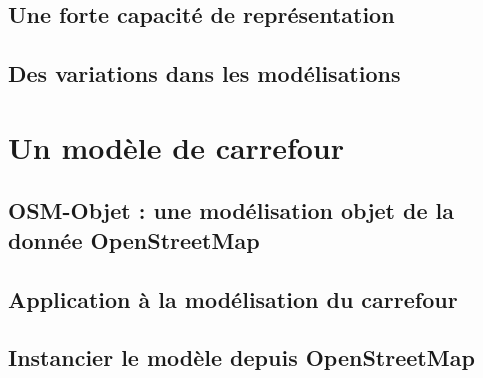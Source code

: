 \subsection{Une forte capacité de représentation}

\todo{}

\subsection{Des variations dans les modélisations}

\todo{}

\section{Un modèle de carrefour}

\todo{}

\subsection{OSM-Objet : une modélisation objet de la donnée OpenStreetMap}

\todo{}

\subsection{Application à la modélisation du carrefour}

\todo{}

\subsection{Instancier le modèle depuis OpenStreetMap}

\todo{}